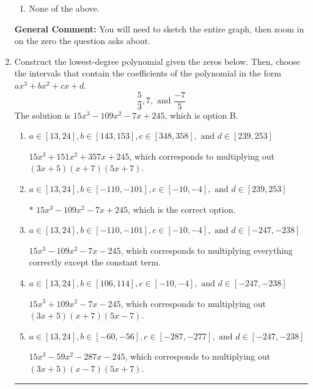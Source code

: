 \documentclass{extbook}[14pt]
\newcommand{\litem}[1]{\item #1

\rule{\textwidth}{0.4pt}}
\begin{document}
\begin{enumerate}
{\begin{enumerate}[label=\Alph*.]
\item None of the above.\end{enumerate}
\textbf{General Comment:} You will need to sketch the entire graph, then zoom in on the zero the question asks about.
}
\litem{
Construct the lowest-degree polynomial given the zeros below. Then, choose the intervals that contain the coefficients of the polynomial in the form $ax^3+bx^2+cx+d$.
\[ \frac{5}{3}, 7, \text{ and } \frac{-7}{5} \]The solution is \( 15x^{3} -109 x^{2} -7 x + 245 \), which is option B.\begin{enumerate}[label=\Alph*.]
\item \( a \in [13, 24], b \in [143, 153], c \in [348, 358], \text{ and } d \in [239, 253] \)

$15x^{3} +151 x^{2} +357 x + 245$, which corresponds to multiplying out $(3x + 5)(x + 7)(5x + 7)$.
\item \( a \in [13, 24], b \in [-110, -101], c \in [-10, -4], \text{ and } d \in [239, 253] \)

* $15x^{3} -109 x^{2} -7 x + 245$, which is the correct option.
\item \( a \in [13, 24], b \in [-110, -101], c \in [-10, -4], \text{ and } d \in [-247, -238] \)

$15x^{3} -109 x^{2} -7 x -245$, which corresponds to multiplying everything correctly except the constant term.
\item \( a \in [13, 24], b \in [106, 114], c \in [-10, -4], \text{ and } d \in [-247, -238] \)

$15x^{3} +109 x^{2} -7 x -245$, which corresponds to multiplying out $(3x + 5)(x + 7)(5x -7)$.
\item \( a \in [13, 24], b \in [-60, -56], c \in [-287, -277], \text{ and } d \in [-247, -238] \)

$15x^{3} -59 x^{2} -287 x -245$, which corresponds to multiplying out $(3x + 5)(x -7)(5x + 7)$.
\end{enumerate}

}
\end{enumerate}
\end{document}
